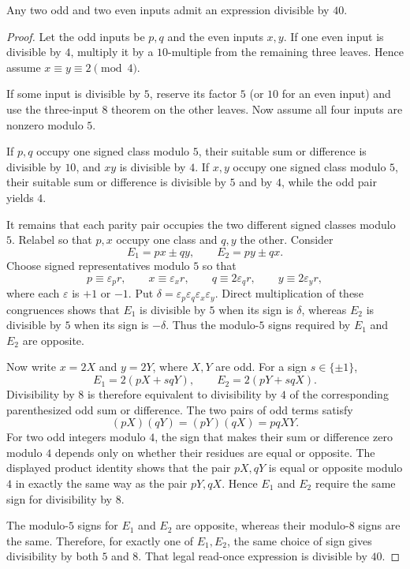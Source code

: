 \begin{theorem}\label{app:twoodd40}
Any two odd and two even inputs admit an expression divisible by $40$.
\end{theorem}
\begin{proof}
Let the odd inputs be $p,q$ and the even inputs $x,y$.  If one even input is
divisible by $4$, multiply it by a $10$-multiple from the remaining three
leaves.  Hence assume $x\equiv y\equiv2\pmod4$.

If some input is divisible by $5$, reserve its factor $5$ (or $10$ for an
even input) and use the three-input $8$ theorem on the other leaves.  Now
assume all four inputs are nonzero modulo $5$.

If $p,q$ occupy one signed class modulo $5$, their suitable sum or difference
is divisible by $10$, and $xy$ is divisible by $4$.  If $x,y$ occupy one
signed class modulo $5$, their suitable sum or difference is divisible by
$5$ and by $4$, while the odd pair yields $4$.

It remains that each parity pair occupies the two different signed classes
modulo $5$.  Relabel so that $p,x$ occupy one class and $q,y$ the other.
Consider
\[
 E_1=px\pm qy,\qquad E_2=py\pm qx.
\]
Choose signed representatives modulo $5$ so that
\[
 p\equiv\varepsilon_p r,\qquad x\equiv\varepsilon_x r,\qquad
 q\equiv2\varepsilon_q r,\qquad y\equiv2\varepsilon_y r,
\]
where each $\varepsilon$ is $+1$ or $-1$.  Put
$\delta=\varepsilon_p\varepsilon_q\varepsilon_x\varepsilon_y$.  Direct
multiplication of these congruences shows that $E_1$ is divisible by $5$
when its sign is $\delta$, whereas $E_2$ is divisible by $5$ when its sign
is $-\delta$.  Thus the modulo-$5$ signs required by $E_1$ and $E_2$ are
opposite.

Now write $x=2X$ and $y=2Y$, where $X,Y$ are odd.  For a sign
$s\in\{\pm1\}$,
\[
 E_1=2(pX+s qY),\qquad E_2=2(pY+s qX).
\]
Divisibility by $8$ is therefore equivalent to divisibility by $4$ of the
corresponding parenthesized odd sum or difference.  The two pairs of odd
terms satisfy
\[
 (pX)(qY)=(pY)(qX)=pqXY.
\]
For two odd integers modulo $4$, the sign that makes their sum or difference
zero modulo $4$ depends only on whether their residues are equal or opposite.
The displayed product identity shows that the pair $pX,qY$ is equal or
opposite modulo $4$ in exactly the same way as the pair $pY,qX$.  Hence
$E_1$ and $E_2$ require the same sign for divisibility by $8$.

The modulo-$5$ signs for $E_1$ and $E_2$ are opposite, whereas their
modulo-$8$ signs are the same.  Therefore, for exactly one of $E_1,E_2$, the
same choice of sign gives divisibility by both $5$ and $8$.  That legal
read-once expression is divisible by $40$.
\end{proof}


